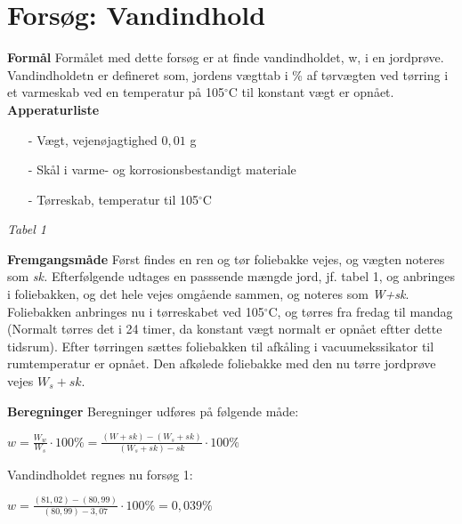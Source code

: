 \chapter{Forsøg: Vandindhold}

\textbf{Formål}
\newline
Formålet med dette forsøg er at finde vandindholdet, w, i en jordprøve. Vandindholdetn er defineret som, jordens vægttab i \% af tørvægten ved tørring i et varmeskab ved en temperatur på 105$^{\circ}$C til konstant vægt er opnået.
\newline
\newline
\textbf{Apperaturliste}
\begin{itemize}
\item[-] Vægt, vejenøjagtighed $0,\!01$ g
\item[-] Skål i varme- og korrosionsbestandigt materiale
\item[-] Tørreskab, temperatur til 105$^{\circ}$C
\end{itemize}

\textit{Tabel 1}


\textbf{Fremgangsmåde}
\newline
Først findes en ren og tør foliebakke vejes, og vægten noteres som \textit{sk.} Efterfølgende udtages en passsende mængde jord, jf. tabel 1, og anbringes i foliebakken, og det hele vejes omgående sammen, og noteres som \textit{W+sk}.
\newline
Foliebakken anbringes nu i tørreskabet ved 105$^{\circ}$C, og tørres fra fredag til mandag (Normalt tørres det i 24 timer, da konstant vægt normalt er opnået eftter dette tidsrum). Efter tørringen sættes foliebakken til afkåling i vacuumekssikator til rumtemperatur er opnået. Den afkølede foliebakke med den nu tørre jordprøve vejes \textit{$W_{s}+sk$}.
\newline
\newline

\textbf{Beregninger}
\newline
Beregninger udføres på følgende måde:
\begin{center}
$w=\frac{W_w}{W_s}\cdot100\%=\frac{(W + sk) - (W_s + sk)}{(W_s + sk) - sk}\cdot100\%$
\end{center}

Vandindholdet regnes nu forsøg 1:
\begin{center}
	$w=\frac{(81,\!02)-(80,\!99)}{(80,\!99)-3,\!07}\cdot100\%=0,\!039\%$
\end{center}

